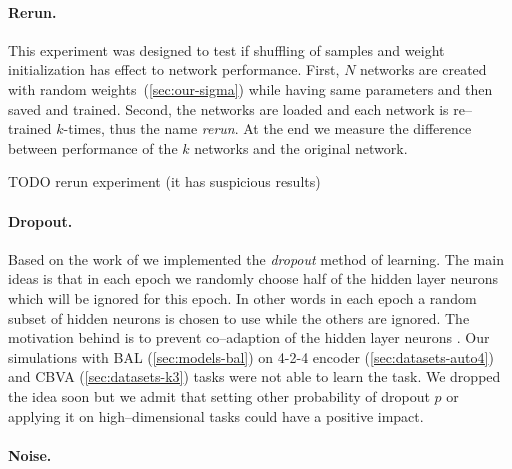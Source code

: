 \paragraph{Rerun.} This experiment was designed to test if shuffling of samples and weight initialization has effect to network performance. First, $N$ networks are created with random weights~(\ref{sec:our-sigma}) while having same parameters and then saved and trained. Second, the networks are loaded and each network is re--trained $k$-times, thus the name \emph{rerun}. At the end we measure the difference between performance of the $k$ networks and the original network. 

TODO rerun experiment (it has suspicious results) 



\paragraph{Dropout.}
Based on the work of \citet{hinton2012improving} we implemented the \emph{dropout} method of learning. The main ideas is that in each epoch we randomly choose half of the hidden layer neurons which will be ignored for this epoch. In other words in each epoch a random subset of hidden neurons is chosen to use while the others are ignored. The motivation behind is to prevent co--adaption of the hidden layer neurons \citep{hinton2012improving}. Our simulations with BAL (\ref{sec:models-bal}) on 4-2-4 encoder (\ref{sec:datasets-auto4}) and CBVA (\ref{sec:datasets-k3}) tasks were not able to learn the task. We dropped the idea soon but we admit that setting other probability of dropout $p$ or applying it on high--dimensional tasks could have a positive impact. 

\paragraph{Noise.} 


